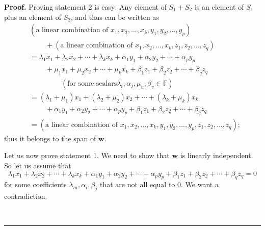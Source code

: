 \documentclass[numbers=enddot,12pt,final,onecolumn,notitlepage]{scrartcl}%
\numberwithin{exer}{subsection}
\theoremstyle{definition}
\newenvironment{proof}[1][Proof]{\noindent\textbf{#1.} }{\ \rule{0.5em}{0.5em}}
\begin{document}
\begin{proof}
Proving statement 2 is easy: Any element of $S_{1}+S_{2}$ is an element of
$S_{1}$ plus an element of $S_{2}$, and thus can be written as
\begin{align*}
&  \left(  \text{a linear combination of }x_{1},x_{2},\ldots,x_{k},y_{1}%
,y_{2},\ldots,y_{p}\right) \\
&  \ \ \ \ \ \ \ \ \ \ +\left(  \text{a linear combination of }x_{1}%
,x_{2},\ldots,x_{k},z_{1},z_{2},\ldots,z_{q}\right) \\
&  =\lambda_{1}x_{1}+\lambda_{2}x_{2}+\cdots+\lambda_{k}x_{k}+\alpha_{1}%
y_{1}+\alpha_{2}y_{2}+\cdots+\alpha_{p}y_{p}\\
&  \ \ \ \ \ \ \ \ \ \ +\mu_{1}x_{1}+\mu_{2}x_{2}+\cdots+\mu_{k}x_{k}%
+\beta_{1}z_{1}+\beta_{2}z_{2}+\cdots+\beta_{q}z_{q}\\
&  \ \ \ \ \ \ \ \ \ \ \ \ \ \ \ \ \ \ \ \ \left(  \text{for some scalars
}\lambda_{i},\alpha_{j},\mu_{u},\beta_{v}\in\mathbb{F}\right) \\
&  =\left(  \lambda_{1}+\mu_{1}\right)  x_{1}+\left(  \lambda_{2}+\mu
_{2}\right)  x_{2}+\cdots+\left(  \lambda_{k}+\mu_{k}\right)  x_{k}\\
&  \ \ \ \ \ \ \ \ \ \ +\alpha_{1}y_{1}+\alpha_{2}y_{2}+\cdots+\alpha_{p}%
y_{p}+\beta_{1}z_{1}+\beta_{2}z_{2}+\cdots+\beta_{q}z_{q}\\
&  =\left(  \text{a linear combination of }x_{1},x_{2},\ldots,x_{k}%
,y_{1},y_{2},\ldots,y_{p},z_{1},z_{2},\ldots,z_{q}\right)  ;
\end{align*}
thus it belongs to the span of $\mathbf{w}$.

Let us now prove statement 1. We need to show that $\mathbf{w}$ is linearly
independent. So let us assume that%
\[
\lambda_{1}x_{1}+\lambda_{2}x_{2}+\cdots+\lambda_{k}x_{k}+\alpha_{1}%
y_{1}+\alpha_{2}y_{2}+\cdots+\alpha_{p}y_{p}+\beta_{1}z_{1}+\beta_{2}%
z_{2}+\cdots+\beta_{q}z_{q}=0
\]
for some coefficients $\lambda_{m},\alpha_{i},\beta_{j}$ that are not all
equal to $0$. We want a contradiction.


\end{proof}
\end{document}
